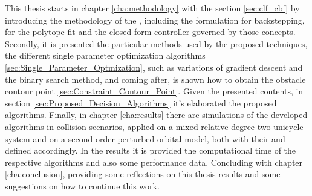 This thesis starts in chapter \ref{cha:methodology} with the section \ref{sec:clf_cbf} by introducing the methodology of the , including the formulation for backstepping, for the polytope fit and the closed-form controller governed by those concepts. Secondly, it is presented the particular methods used by the proposed techniques, the different single parameter optimization algorithms \ref{sec:Single_Parameter_Optmization}, such as variations of gradient descent and the binary search method, and coming after, is shown how to obtain the obstacle contour point \ref{sec:Constraint_Contour_Point}. Given the presented contents, in section \ref{sec:Proposed_Decision_Algorithms} it's elaborated the proposed algorithms. Finally, in chapter \ref{cha:results} there are simulations of the developed algorithms in collision scenarios, applied on a mixed-relative-degree-two unicycle system and on a second-order perturbed orbital model, both with their  and  defined accordingly. In the results it is provided the computational time of the respective algorithms and also some performance data. Concluding with chapter \ref{cha:conclusion}, providing some reflections on this thesis results and some suggestions on how to continue this work.






































